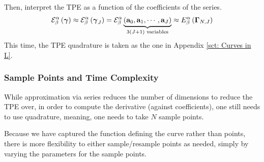 \documentclass[../dissertation.tex]{subfiles}
\begin{document}
Then, interpret the TPE as a function of the coefficients of the series.
\begin{equation}
    \mathcal{E}_{\beta}^{\alpha} \left( \boldsymbol{\gamma} \right)
    \approx
    \mathcal{E}_{\beta}^{\alpha} \left( \boldsymbol{\gamma}_{J} \right)
    =
    \mathcal{E}_{\beta}^{\alpha} \underbrace{\left( \mathbf{a}_{0}, \mathbf{a}_{1}, \cdots, \mathbf{a}_{J} \right)}_{3\left( J+1 \right) \text{ variables}}
    \approx
    E_{\beta}^{\alpha} \left( \boldsymbol{\Gamma}_{N,J} \right)
\end{equation}
This time, the TPE quadrature is taken as the one in Appendix \ref{sct: Curves in L}.

\subsubsection{Sample Points and Time Complexity}
While approximation via series reduces the number of dimensions to reduce the TPE over,
in order to compute the derivative (against coefficients),
one still needs to use quadrature, meaning, one needs to take $N$ sample points.

Because we have captured the function defining the curve rather than points,
there is more flexibility to either sample/resample points as needed,
simply by varying the parameters for the sample points.
\end{document}
